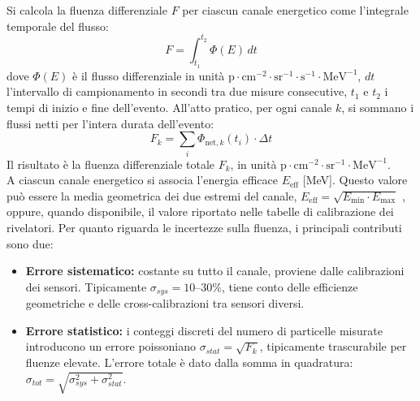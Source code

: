 \documentclass[12pt]{report}
\begin{document}
Si calcola la fluenza differenziale $F$ per ciascun canale energetico come l'integrale temporale del flusso:
\begin{equation}
    F = \int_{t_1}^{t_2} \Phi(E) \, dt 
    \label{eq:calcolo_fluenza_diff}
\end{equation}
dove $\Phi(E)$ è il flusso differenziale in unità $\mathrm{p \cdot cm^{-2} \cdot sr^{-1} \cdot s^{-1} \cdot MeV^{-1}}$, $dt$ l'intervallo di campionamento in secondi tra due misure consecutive, $t_1$ e $t_2$ i tempi di inizio e fine dell'evento.
All'atto pratico, per ogni canale $k$, si sommano i flussi netti per l'intera durata dell'evento:
\begin{equation}
    F_k = \sum_{i} \Phi_{\text{net},k}(t_i) \cdot \Delta t
\end{equation}
 Il risultato è la fluenza differenziale totale $F_k$, in unità $\mathrm{p \cdot cm^{-2} \cdot sr^{-1} \cdot MeV^{-1}}$. \\
 A ciascun canale energetico si associa l'energia efficace $E_{\text{eff}}$ [MeV]. Questo valore può essere  la media geometrica dei due estremi del canale,  $E_{\text{eff}} = \sqrt{E_{\text{min}} \cdot E_{\text{max}}}$ \cite{Rodriguez2017}, oppure, quando disponibile, il valore riportato nelle tabelle di calibrazione dei rivelatori. 
Per quanto riguarda le incertezze sulla fluenza, i principali contributi sono due: 
\begin{itemize}[nosep]
    \item[-] \textbf{Errore sistematico:} costante su tutto il canale, proviene dalle calibrazioni dei sensori. Tipicamente $\sigma_{sys} = 10$--$30\%$, tiene conto delle efficienze geometriche e delle cross-calibrazioni tra sensori diversi. 
    \item[-] \textbf{Errore statistico:} i conteggi discreti del numero di particelle misurate introducono un errore poissoniano $\sigma_{stat} = \sqrt{F_k}$, tipicamente trascurabile per fluenze elevate. L'errore totale è dato dalla somma in quadratura: $\sigma_{tot} = \sqrt{\sigma_{sys}^2 + \sigma_{stat}^2}$.
\end{itemize}
\end{document}
